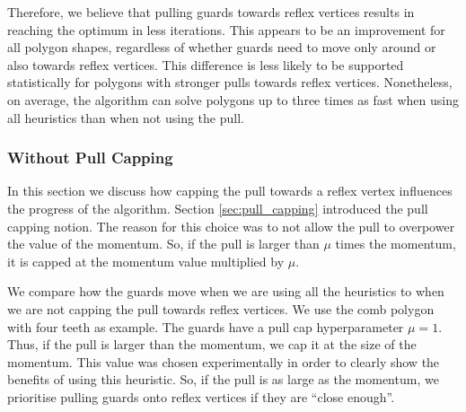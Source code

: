 Therefore, we believe that pulling guards towards reflex vertices results in reaching the optimum in less iterations. This appears to be an improvement for all polygon shapes, regardless of whether guards need to move only around or also towards reflex vertices. This difference is less likely to be supported statistically for polygons with stronger pulls towards reflex vertices. Nonetheless, on average, the algorithm can solve polygons up to three times as fast when using all heuristics than when not using the pull.



\newpage
\subsubsection{Without Pull Capping}
In this section we  discuss how capping the pull towards a reflex vertex influences the progress of the algorithm. Section \ref{sec:pull_capping} introduced the pull capping notion. The reason for this choice was to not allow the pull to overpower the value of the momentum. So, if the pull is larger than $\mu$ times the momentum, it is capped at the momentum value multiplied by $\mu$. 

We  compare how the guards move when we are using all the heuristics to when we are not capping the pull towards reflex vertices. We  use the comb polygon with four teeth as example. The guards have a pull cap hyperparameter $\mu = 1$. Thus, if the pull is larger than the momentum, we cap it at the size of the momentum. This value was chosen experimentally in order to clearly show the benefits of using this heuristic. So, if the pull is as large as the momentum, we prioritise pulling guards onto reflex vertices if they are ``close enough''.



